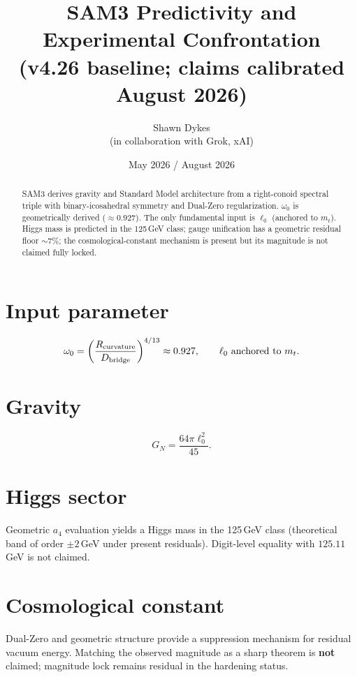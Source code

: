 \documentclass[11pt,a4paper]{article}
\title{\textbf{SAM3 Predictivity and Experimental Confrontation} \\
(v4.26 baseline; claims calibrated August 2026)}
\author{Shawn Dykes \\ (in collaboration with Grok, xAI)}
\date{May 2026 / August 2026}
\begin{document}
\maketitle

\begin{center}
\end{center}

\vspace{1em}

\begin{abstract}
SAM3 derives gravity and Standard Model architecture from a right-conoid spectral triple with binary-icosahedral symmetry and Dual-Zero regularization. $\omega_0$ is geometrically derived ($\approx 0.927$). The only fundamental input is $\ell_0$ (anchored to $m_t$). Higgs mass is predicted in the 125\,GeV class; gauge unification has a geometric residual floor $\sim 7\%$; the cosmological-constant mechanism is present but its magnitude is not claimed fully locked.
\end{abstract}

\section{Input parameter}
\[
\omega_0 = \left( \frac{R_{\rm curvature}}{D_{\rm bridge}} \right)^{4/13} \approx 0.927,\qquad
\ell_0\ \text{anchored to } m_t.
\]

\section{Gravity}
\[
G_N = \frac{64\pi \ell_0^2}{45}.
\]

\section{Higgs sector}
Geometric $a_4$ evaluation yields a Higgs mass in the 125\,GeV class (theoretical band of order $\pm 2$\,GeV under present residuals). Digit-level equality with $125.11$\,GeV is not claimed.

\section{Cosmological constant}
Dual-Zero and geometric structure provide a suppression mechanism for residual vacuum energy. Matching the observed magnitude as a sharp theorem is \textbf{not} claimed; magnitude lock remains residual in the hardening status.
\end{document}
